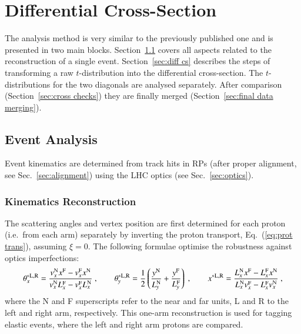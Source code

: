 \section{Differential Cross-Section}
\label{sec:differential cross-section}

The analysis method is very similar to the previously published one \cite{8tev-90m} and is presented in two main blocks. Section~\ref{sec:event analysis} covers all aspects related to the reconstruction of a single event. Section~\ref{sec:diff cs} describes the steps of transforming a raw $t$-distribution into the differential cross-section. The $t$-distributions for the two diagonals are analysed separately. After comparison (Section~\ref{sec:cross checks}) they are finally merged (Section~\ref{sec:final data merging}).

\subsection{Event Analysis}
\label{sec:event analysis}

Event kinematics are determined from track hits in RPs (after proper alignment, see Sec.~\ref{sec:alignment}) using the LHC optics (see Sec.~\ref{sec:optics}).


\subsubsection{Kinematics Reconstruction}
\label{sec:kinematics}

The scattering angles and vertex position are first determined for each proton (i.e.~from each arm) separately by inverting the proton transport, Eq.~(\ref{eq:prot trans}), assuming $\xi = 0$. The following formulae optimise the robustness against optics imperfections:
\begin{equation}
\label{eq:kin 1a}
	\theta_x^{*\rm L,R} = {v_x^{\rm N} x^{\rm F} - v_x^{\rm F} x^{\rm N}\over v_x^{\rm N} L_x^{\rm F} - v_x^{\rm F} L_x^{\rm N}}\ ,\qquad
	\theta_y^{*\rm L,R} = {1\over 2} \left( {y^{\rm N}\over L_y^{\rm N}} + {y^{\rm F}\over L_y^{\rm F}} \right)\ ,\qquad
	x^{*\rm L,R} = {L_x^{\rm N} x^{\rm F} - L_x^{\rm F} x^{\rm N}\over L_x^{\rm N} v_x^{\rm F} - L_x^{\rm F} v_x^{\rm N}}\ , 
\end{equation}
where the N and F superscripts refer to the near and far units, L and R to the left and right arm, respectively. This one-arm reconstruction is used for tagging elastic events, where the left and right arm protons are compared.

